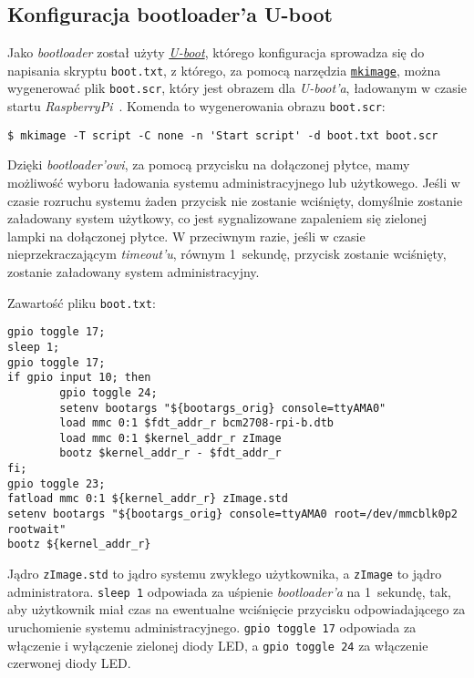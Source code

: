 \documentclass{article}
\begin{document}

\subsection{Konfiguracja bootloader'a U-boot}

Jako \emph{bootloader} został użyty \href{http://www.denx.de/wiki/u-boot/}{\emph{U-boot}}, którego konfiguracja sprowadza się do napisania skryptu \texttt{boot.txt}, z którego, za pomocą narzędzia \href{http://linux.die.net/man/1/mkimage}{\texttt{mkimage}}, można wygenerować plik \texttt{boot.scr}, który jest obrazem dla \emph{U-boot'a}, ładowanym w czasie startu \emph{RaspberryPi}~\cite{www:uboot_manual,www:uboot_guide}. Komenda to wygenerowania obrazu \texttt{boot.scr}:
\begin{verbatim}
$ mkimage -T script -C none -n 'Start script' -d boot.txt boot.scr
\end{verbatim}

Dzięki \emph{bootloader'owi}, za pomocą przycisku na dołączonej płytce, mamy możliwość wyboru ładowania systemu administracyjnego lub użytkowego. Jeśli w czasie rozruchu systemu żaden przycisk nie zostanie wciśnięty, domyślnie zostanie załadowany system użytkowy, co jest sygnalizowane zapaleniem się zielonej lampki na dołączonej płytce. W przeciwnym razie, jeśli w czasie nieprzekraczającym \emph{timeout'u}, równym 1~sekundę, przycisk zostanie wciśnięty, zostanie załadowany system administracyjny.

Zawartość pliku \texttt{boot.txt}:
\begin{lstlisting}[frame=single,breaklines,basicstyle=\small]
gpio toggle 17;
sleep 1;
gpio toggle 17;
if gpio input 10; then
        gpio toggle 24;
        setenv bootargs "${bootargs_orig} console=ttyAMA0"
        load mmc 0:1 $fdt_addr_r bcm2708-rpi-b.dtb
        load mmc 0:1 $kernel_addr_r zImage
        bootz $kernel_addr_r - $fdt_addr_r
fi;
gpio toggle 23;
fatload mmc 0:1 ${kernel_addr_r} zImage.std
setenv bootargs "${bootargs_orig} console=ttyAMA0 root=/dev/mmcblk0p2 rootwait"
bootz ${kernel_addr_r}
\end{lstlisting}
Jądro \texttt{zImage.std} to jądro systemu zwykłego użytkownika, a \texttt{zImage} to jądro administratora. \texttt{sleep 1} odpowiada za uśpienie \emph{bootloader'a} na 1~sekundę, tak, aby użytkownik miał czas na ewentualne wciśnięcie przycisku odpowiadającego za uruchomienie systemu administracyjnego. \texttt{gpio toggle 17} odpowiada za włączenie i wyłączenie zielonej diody LED, a \texttt{gpio toggle 24} za włączenie czerwonej diody LED.
\end{document}
